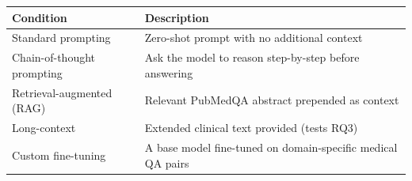 \documentclass[11pt]{article}
\begin{document}
\begin{table}[ht]
\centering
\renewcommand{\arraystretch}{1.5} 
\begin{tabular}{ll}
\toprule
\textbf{Condition} & \textbf{Description} \\
\midrule
Standard prompting & Zero-shot prompt with no additional context \\
Chain-of-thought prompting & Ask the model to reason step-by-step before answering \\
Retrieval-augmented (RAG) & Relevant PubMedQA abstract prepended as context \\
Long-context & Extended clinical text provided (tests RQ3) \\
Custom fine-tuning & A base model fine-tuned on domain-specific medical QA pairs \\
\bottomrule
\end{tabular}
\end{table}
\end{document}
